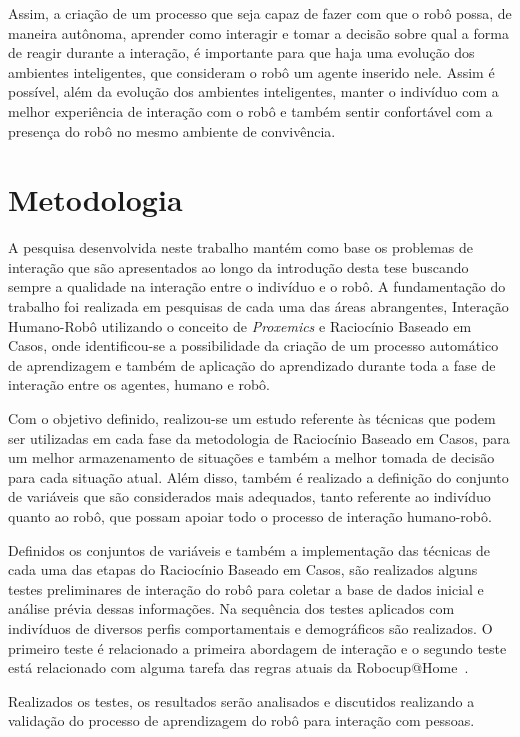 Assim, a criação de um processo que seja capaz de fazer com que o robô possa, de maneira autônoma, aprender como interagir e tomar a decisão sobre qual a forma de reagir durante a interação, é importante para que haja uma evolução dos ambientes inteligentes, que consideram o robô um agente inserido nele. Assim é possível, além da evolução dos ambientes inteligentes, manter o indivíduo com a melhor experiência de interação com o robô e também sentir confortável com a presença do robô no mesmo ambiente de convivência.

\section{Metodologia}
A pesquisa desenvolvida neste trabalho mantém como base os problemas de interação que são apresentados ao longo da introdução desta tese buscando sempre a qualidade na interação entre o indivíduo e o robô. A fundamentação do trabalho foi realizada em pesquisas de cada uma das áreas abrangentes, Interação Humano-Robô utilizando o conceito de \emph{Proxemics} e Raciocínio Baseado em Casos, onde identificou-se a possibilidade da criação de um processo automático de aprendizagem e também de aplicação do aprendizado durante toda a fase de interação entre os agentes, humano e robô.

Com o objetivo definido, realizou-se um estudo referente às técnicas que podem ser utilizadas em cada fase da metodologia de Raciocínio Baseado em Casos, para um melhor armazenamento de situações e também a melhor tomada de decisão para cada situação atual. Além disso, também é realizado a definição do conjunto de variáveis que são considerados mais adequados, tanto referente ao indivíduo quanto ao robô, que possam apoiar todo o processo de interação humano-robô.

Definidos os conjuntos de variáveis e também a implementação das técnicas de cada uma das etapas do Raciocínio Baseado em Casos, são realizados alguns testes preliminares de interação do robô para coletar a base de dados inicial e análise prévia dessas informações. Na sequência dos testes aplicados com indivíduos de diversos perfis comportamentais e demográficos são realizados. O primeiro teste é relacionado a primeira abordagem de interação e o segundo teste está relacionado com alguma tarefa das regras atuais da Robocup@Home~\cite{Robocup:2015}.

Realizados os testes, os resultados serão analisados e discutidos realizando a validação do processo de aprendizagem do robô para interação com pessoas.

